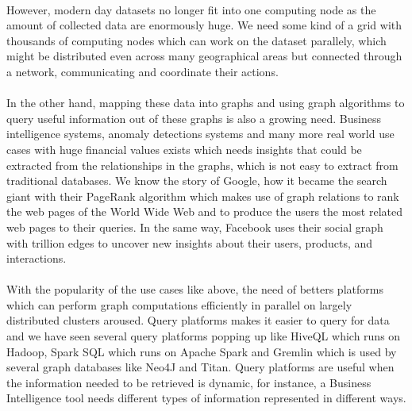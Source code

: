 \documentclass[12pt]{report}
\numberwithin{figure}{section}
\numberwithin{table}{section}
\begin{document}
\paragraph{}

However, modern day datasets no longer fit into one computing node as the amount of collected data are enormously huge.  We need some kind of a grid with thousands of computing nodes which can work on the dataset parallely, which might be distributed even across many geographical areas but connected through a network, communicating and coordinate their actions.

\paragraph{}

In the other hand, mapping these data into graphs and using graph algorithms to query useful information out of these graphs is also a growing need. Business intelligence systems, anomaly detections systems and many more real world use cases with huge financial values exists which needs insights that could be extracted from the relationships in the graphs, which is not easy to extract from traditional databases. We know the story of Google, how it became the search giant with their PageRank\cite{PageRank} algorithm which makes use of graph relations to rank the web pages of the World Wide Web and to produce the users the most related web pages to their queries. In the same way, Facebook uses their social graph with trillion edges\cite{Facebook} to uncover new insights about their users, products, and interactions.

\paragraph{}

With the popularity of the use cases like above, the need of betters platforms which can perform graph computations efficiently in parallel on largely distributed clusters aroused. Query platforms makes it easier to query for data and we have seen several query platforms popping up like HiveQL which runs on Hadoop, Spark SQL which runs on Apache Spark and Gremlin which is used by several graph databases like Neo4J and Titan. Query platforms are useful when the information needed to be retrieved is dynamic, for instance, a Business Intelligence tool needs different types of information represented in different ways.

\paragraph{}
\end{document}
